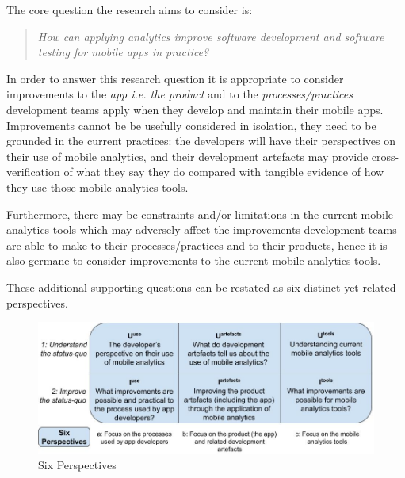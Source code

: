 The core question the research aims to consider is:
\begin{quote}
  \emph{How can applying analytics improve software development and software testing for mobile apps in practice?}~\label{overall-research-question}  
\end{quote}

In order to answer this research question it is appropriate to consider improvements to the \emph{app i.e. the product} and to the \emph{processes/practices} development teams apply when they develop and maintain their mobile apps. Improvements cannot be be usefully considered in isolation, they need to be grounded in the current practices: the developers will have their perspectives on their use of mobile analytics, and their development artefacts may provide cross-verification of what they say they do compared with tangible evidence of how they use those mobile analytics tools. 

Furthermore, there may be constraints and/or limitations in the current mobile analytics tools which may adversely affect the improvements development teams are able to make to their processes/practices and to their products, hence it is also germane to consider improvements to the current mobile analytics tools.

These additional supporting questions can be restated as six distinct yet related perspectives.

\begin{figure}
    \includegraphics[width=\linewidth]{images/my/six-perspectives-2x3-matrix-12-nov-2021.jpeg}
    \caption{Six Perspectives}
    \label{fig:six-perspectives-in-the-research-questions-section}
\end{figure}

